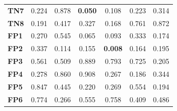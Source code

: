 \begin{table}
\begin{tabular}{lccc|ccc}
        \textbf{TN7}  & 0.224                                   & 0.878                                             & \cellcolor[HTML]{EFEFEF}\textbf{0.050} & 0.108                                    & 0.223                                  & 0.314                                  \\
        \textbf{TN8}  & 0.191                                   & 0.417                                             & 0.327                                  & 0.168                                    & 0.761                                  & 0.872                                  \\
        \textbf{FP1}  & 0.270                                   & 0.545                                             & 0.065                                  & 0.093                                    & 0.333                                  & 0.174                                  \\
        \textbf{FP2}  & 0.337                                   & 0.114                                             & 0.155                                  & \cellcolor[HTML]{EFEFEF}\textbf{0.008}   & 0.164                                  & 0.195                                  \\
        \textbf{FP3}  & 0.561                                   & 0.509                                             & 0.889                                  & 0.793                                    & 0.725                                  & 0.205                                  \\
        \textbf{FP4}  & 0.278                                   & 0.860                                             & 0.908                                  & 0.267                                    & 0.186                                  & 0.344                                  \\
        \textbf{FP5}  & 0.847                                   & 0.445                                             & 0.220                                  & 0.269                                    & 0.554                                  & 0.194                                  \\
        \textbf{FP6}  & 0.774                                   & 0.266                                             & 0.555                                  & 0.758                                    & 0.409                                  & 0.486                                  \\

\end{tabular}
\end{table}
